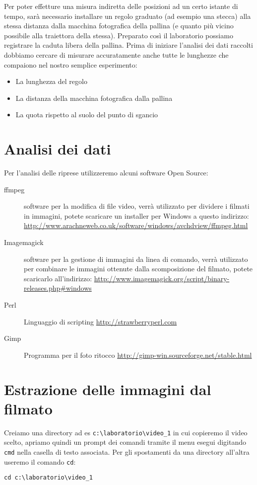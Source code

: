 \documentclass[a4paper,10pt,oneside]{article}
\begin{document}
Per poter effetture una misura indiretta delle posizioni ad un certo istante di tempo, sarà necessario installare un regolo graduato (ad esempio una stecca) alla stessa distanza dalla macchina fotografica della pallina (e quanto più vicino possibile alla traiettora della stessa). Preparato così il laboratorio possiamo registrare la caduta libera della pallina. Prima di iniziare l'analisi dei dati raccolti dobbiamo cercare di misurare accuratamente anche tutte le lunghezze che compaiono nel nostro semplice esperimento:
\begin{itemize}
 \item La lunghezza del regolo
 \item La distanza della macchina fotografica dalla pallina
 \item La quota rispetto al suolo del punto di sgancio
\end{itemize}

\section{Analisi dei dati}

Per l'analisi delle riprese utilizzeremo alcuni software Open Source:
\begin{description}
 \item [ffmpeg] software per la modifica di file video, verrà utilizzato per dividere i filmati in immagini, potete scaricare un installer per Windows a questo indirizzo:
\url{http://www.arachneweb.co.uk/software/windows/avchdview/ffmpeg.html}
\item [Imagemagick] software per la gestione di immagini da linea di comando, verrà utilizzato per combinare le immagini ottenute dalla scomposizione del filmato, potete scaricarlo all'indirizzo: \url{http://www.imagemagick.org/script/binary-releases.php#windows}
\item[Perl] Linguaggio di scripting \url{http://strawberryperl.com}
\item [Gimp] Programma per il foto ritocco \url{http://gimp-win.sourceforge.net/stable.html}
\end{description}


\section{Estrazione delle immagini dal filmato}

Creiamo una directory ad es \verb#c:\laboratorio\video_1# in cui copieremo il video scelto, apriamo quindi un prompt dei comandi tramite il menu esegui digitando \verb#cmd# nella casella di testo associata. Per gli spostamenti da una directory all'altra useremo il comando \verb#cd#:
\begin{verbatim}
cd c:\laboratorio\video_1
\end{verbatim}
\end{document}
